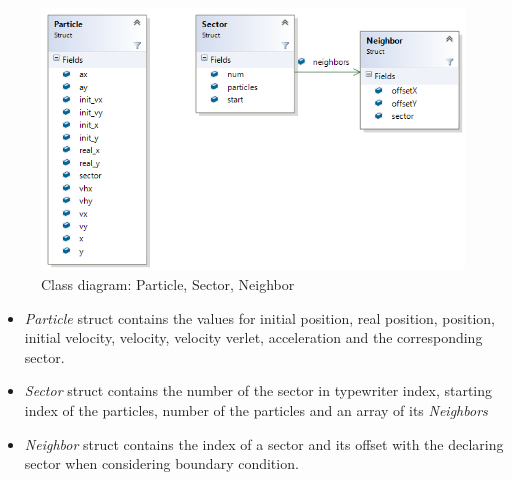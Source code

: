 \documentclass[a4paper,11pt]{article}
\begin{document}
\begin{figure}[!htb]
  \centering
  \includegraphics{class_diagram.png}
  \caption{\small Class diagram: Particle, Sector, Neighbor}
\end{figure}
\begin{itemize}
    \setlength\itemsep{0em}
\item \emph{Particle} struct contains the values for initial position, real position, position, initial velocity, velocity, velocity verlet, acceleration and the corresponding sector.
\item \emph{Sector} struct contains the number of the sector in typewriter index, starting index of the particles, number of the particles and an array of its \emph{Neighbors}
\item \emph{Neighbor} struct contains the index of a sector and its offset with the declaring sector when considering boundary condition.
\end{itemize}
\newpage
\end{document}
